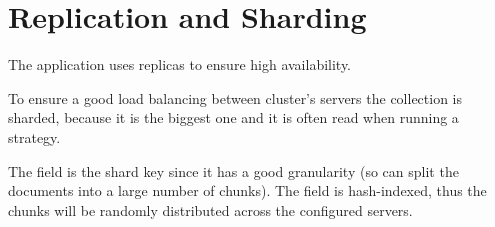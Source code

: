 \section{Replication and Sharding}\label{sec:distributed}
The application uses replicas to ensure high availability.

To ensure a good load balancing between cluster's servers the 
collection is sharded, because it is the biggest one and it is often read when
running a strategy.

The  field is the shard key since it has a good granularity (so
\mongodb{} can split the documents into a large number of chunks). The field is
hash-indexed, thus the chunks will be randomly distributed across the configured
servers.
